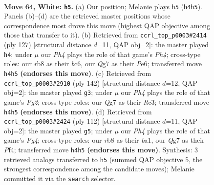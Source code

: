 \documentclass[11pt]{article}
\begin{document}
\clearpage

\begin{figure}[p]\centering
\begin{subfigure}{0.46\textwidth}\centering
\resizebox{\linewidth}{!}{%
\newchessgame
\chessboard[
  setfen={1r6/6Q1/3k4/6P1/4P2P/8/2K5/8 w - - 13 64},
  showmover=false,
  pgfstyle=straightmove, color=movearrow, markmove={h4-h5}
]}
\caption{}
\end{subfigure}\hfill
\begin{subfigure}{0.46\textwidth}\centering
\resizebox{\linewidth}{!}{%
\newchessgame
\chessboard[
  setfen={8/8/2B1p3/7p/2K2kp1/P7/8/8 b - - 1 64},
  showmover=false,
  pgfstyle=straightmove, color=movearrow, markmove={h5-h4}
]}
\caption{}
\end{subfigure}
\\[4pt]
\begin{subfigure}{0.46\textwidth}\centering
\resizebox{\linewidth}{!}{%
\newchessgame
\chessboard[
  setfen={8/6p1/8/4K2k/r7/2R4P/6P1/8 w - - 7 72},
  showmover=false,
  pgfstyle=straightmove, color=movearrow, markmove={g2-g3}
]}
\caption{}
\end{subfigure}\hfill
\begin{subfigure}{0.46\textwidth}\centering
\resizebox{\linewidth}{!}{%
\newchessgame
\chessboard[
  setfen={8/4k3/8/7P/4KPP1/8/8/b7 w - - 1 57},
  showmover=false,
  pgfstyle=straightmove, color=movearrow, markmove={g4-g5}
]}
\caption{}
\end{subfigure}
\caption{\textbf{Move 64, White: \texttt{h5}.} (a) Our position; Melanie plays \texttt{h5} (\texttt{h4h5}). Panels (b)--(d) are the retrieved master positions whose correspondence most drove this move (highest QAP objective among those that transfer to it). (b) Retrieved from \texttt{ccrl\_top\_p0003\#2414} (ply 127) [structural distance $d$=11, QAP obj=2]: the master played \texttt{h4}; under $\mu$ our \emph{Ph4} plays the role of that game's \emph{Ph4}; cross-type roles: our \emph{r}b8 as their \emph{b}c6, our \emph{Q}g7 as their \emph{P}e6; transferred move \texttt{h4h5} \textbf{(endorses this move)}. (c) Retrieved from \texttt{ccrl\_top\_p0003\#2910} (ply 142) [structural distance $d$=12, QAP obj=2]: the master played \texttt{g3}; under $\mu$ our \emph{Ph4} plays the role of that game's \emph{Pg2}; cross-type roles: our \emph{Q}g7 as their \emph{R}c3; transferred move \texttt{h4h5} \textbf{(endorses this move)}. (d) Retrieved from \texttt{ccrl\_top\_p0003\#2424} (ply 112) [structural distance $d$=11, QAP obj=2]: the master played \texttt{g5}; under $\mu$ our \emph{Ph4} plays the role of that game's \emph{Pg4}; cross-type roles: our \emph{r}b8 as their \emph{b}a1, our \emph{Q}g7 as their \emph{P}f4; transferred move \texttt{h4h5} \textbf{(endorses this move)}. Synthesis: 3 retrieved analogs transferred to \texttt{h5} (summed QAP objective 5, the strongest correspondence among the candidate moves); Melanie committed it via the \texttt{search} selector.}
\label{fig:thought-m126}
\end{figure}
\end{document}
